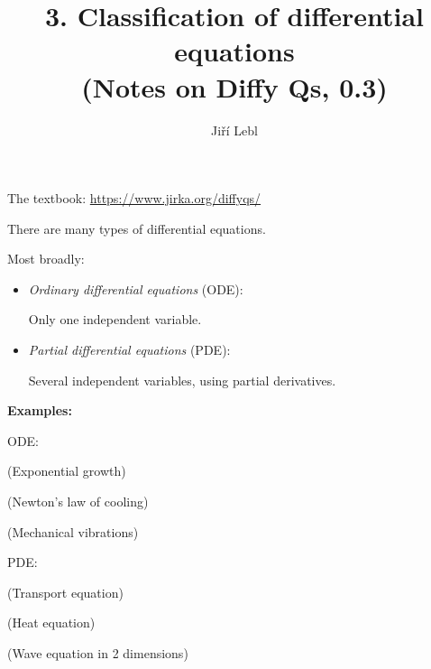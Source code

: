 \documentclass[10pt,aspectratio=169]{beamer}
\author{Ji\v{r}\'i Lebl}
\institute[OSU]{%
Oklahoma State University%
}
\title{3. Classification of differential equations\\(Notes on Diffy Qs, 0.3)}
\date{}
\begin{document}
\begin{frame}
\titlepage


\begin{center}
The textbook: \url{https://www.jirka.org/diffyqs/}
\end{center}
\end{frame}

\begin{frame}
There are many types of differential equations.

\medskip
\pause

Most broadly:

\begin{itemize}
\item
\pause
\emph{Ordinary differential equations} (ODE):

Only one independent variable.
\item
\pause
\emph{Partial differential equations} (PDE):

Several independent variables, using partial derivatives.
\end{itemize}

\end{frame}

\begin{frame}

\textbf{Examples:}

\medskip

ODE:

\medskip
\pause

\quad{}\hspace*{2in}%
(Exponential growth)

\medskip
\pause

\quad{}\hspace*{2in}%
(Newton's law of cooling)

\medskip
\pause

\quad{}\hspace*{2in}%
(Mechanical vibrations)

\medskip
\pause

PDE:

\medskip
\pause

\quad{}\hspace*{2in}%
(Transport equation)

\medskip
\pause

\quad{}\hspace*{2in}%
(Heat equation)
\medskip
\pause

\quad{}\hspace*{2in}%
(Wave equation in 2 dimensions)

\end{frame}
\end{document}
